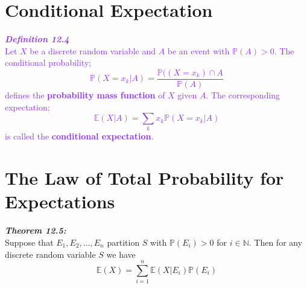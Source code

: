 \documentclass{report}
\newenvironment{cframed}[1][BlueViolet]
  {\begin{tcolorbox}[colframe=#1,colback=white]}
  {\end{tcolorbox}}
\newenvironment{cframed2}[1][PineGreen]
  {\begin{tcolorbox}[colframe=#1,colback=white]}
  {\end{tcolorbox}}
\begin{document}
\section{Conditional Expectation}

\begin{cframed}
    \textcolor{BlueViolet}{\textbf{\textit{Definition 12.4}}\\
    Let $X$ be a discrete random variable and $A$ be an event with $\mathbb{P}(A) > 0$. The conditional probability;
    \begin{equation}
        \mathbb{P}(X = x_k | A) = \frac{\mathbb{P}((X = x_k) \cap A}{\mathbb{P}(A)}
    \end{equation}
    defines the \textbf{probability mass function} of $X$ given $A$. The corresponding expectation;
    \begin{equation}
        \mathbb{E}(X|A) = \sum_k x_k \mathbb{P}(X = x_k | A)
    \end{equation}
    is called the \textbf{conditional expectation}.}
\end{cframed}

\section{The Law of Total Probability for Expectations}

\begin{cframed2}
    \textcolor{PineGreen}{\textbf{\textit{Theorem 12.5:}}\\
    Suppose that $E_1,E_2,...,E_n$ partition $S$ with $\mathbb{P}(E_i) > 0$ for $i \in \mathbb{N}$. Then for any discrete random variable $S$ we have
    \begin{equation}
        \mathbb{E}(X) = \sum_{i=1}^n \mathbb{E}(X|E_i)\mathbb{P}(E_i)
    \end{equation}}
\end{cframed2}
\end{document}
